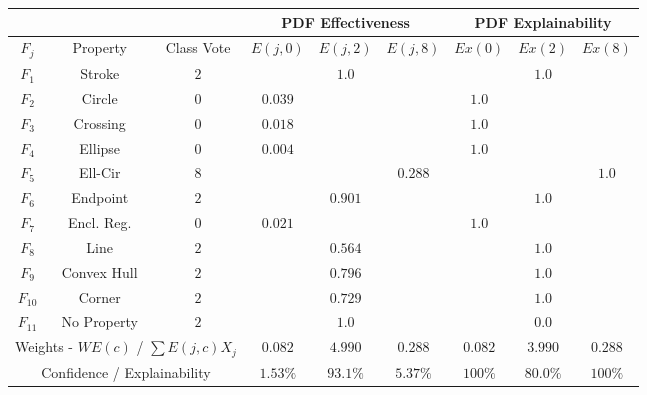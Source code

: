 \begin{table}[H]
        \renewcommand{\arraystretch}{1.3}
        \label{table:mnist_example2_ex}
        \begin{center}
        \begin{tabular}{| c | c | c | c | c | c || c | c | c |}
        \cline{4-9}
        \multicolumn{3}{c}{} & \multicolumn{3}{|c||}{PDF Effectiveness} & \multicolumn{3}{c|}{PDF Explainability} \\
        \hline
        $F_j$ & Property & Class Vote & $E(j,0)$ & $E(j,2)$ & $E(j,8)$ & $Ex(0)$ & $Ex(2)$ & $Ex(8)$ \\
        \hline
        \hline
        $F_1$ & Stroke & $2$ &  & $1.0$ &  &  & $1.0$ & \\ 
        \hline
        $F_2$ & Circle & $0$ & $0.039$ &  &  & $1.0$ &  & \\
        \hline
        $F_3$ & Crossing & $0$ & $0.018$ &  &  & $1.0$ &  & \\
        \hline
        $F_4$ & Ellipse & $0$ & $0.004$ &  &  & $1.0$ &  & \\
        \hline
        $F_5$ & Ell-Cir & $8$ &  &  & $0.288$ &  &  & $1.0$ \\
        \hline
        $F_6$ & Endpoint & $2$ &  & $0.901$ &  &  & $1.0$ & \\
        \hline
        $F_7$ & Encl. Reg. & $0$ & $0.021$ &  &  & $1.0$ &  & \\
        \hline
        $F_8$ & Line & $2$ &  & $0.564$ &  &  & $1.0$ & \\
        \hline
        $F_9$& Convex Hull & $2$ &  & $0.796$ &  &  & $1.0$ & \\
        \hline
        $F_{10}$& Corner & $2$ &  & $0.729$ &  &  & $1.0$ & \\
        \hline
        $F_{11}$& No Property & $2$ &  & $1.0$ &  &  & $0.0$ & \\
        \hline
        \hline
        \multicolumn{3}{|c|}{Weights - $WE(c)$ / $\sum E(j,c)X_j$} & $0.082$ & $4.990$ & $0.288$ & $0.082$ & $3.990$ & $0.288$ \\
        \cline{0-8}
        \multicolumn{3}{|c|}{Confidence / Explainability} & $1.53\%$ & $93.1\%$ & $5.37\%$ & $100\%$ & $80.0\%$ & $100\%$ \\
        \cline{0-8}
        \end{tabular}
        \end{center}
\end{table}

